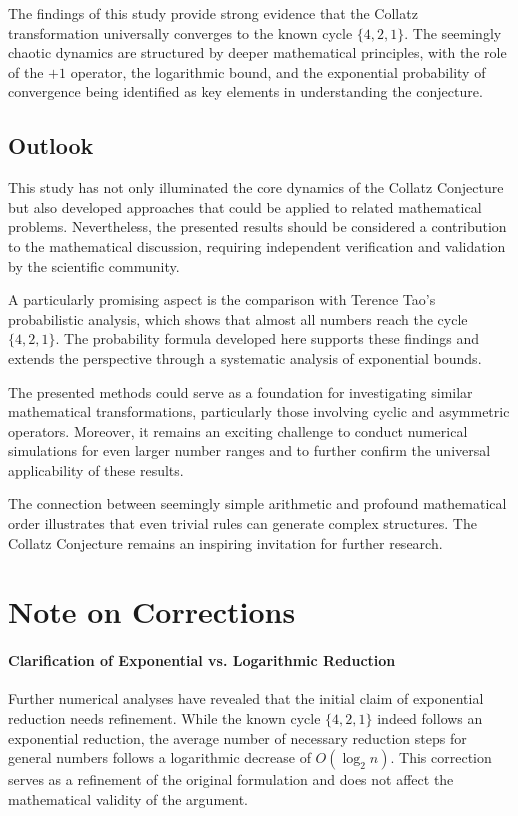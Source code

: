 \documentclass[a4paper,12pt]{article}
\begin{document}
The findings of this study provide strong evidence that the Collatz transformation universally converges to the known cycle \( \{4, 2, 1\} \). The seemingly chaotic dynamics are structured by deeper mathematical principles, with the role of the \(+1\) operator, the logarithmic bound, and the exponential probability of convergence being identified as key elements in understanding the conjecture.

\subsection{Outlook}
This study has not only illuminated the core dynamics of the Collatz Conjecture but also developed approaches that could be applied to related mathematical problems. Nevertheless, the presented results should be considered a contribution to the mathematical discussion, requiring independent verification and validation by the scientific community.

A particularly promising aspect is the comparison with Terence Tao’s probabilistic analysis, which shows that almost all numbers reach the cycle \( \{4,2,1\} \). The probability formula developed here supports these findings and extends the perspective through a systematic analysis of exponential bounds.

The presented methods could serve as a foundation for investigating similar mathematical transformations, particularly those involving cyclic and asymmetric operators. Moreover, it remains an exciting challenge to conduct numerical simulations for even larger number ranges and to further confirm the universal applicability of these results.

The connection between seemingly simple arithmetic and profound mathematical order illustrates that even trivial rules can generate complex structures. The Collatz Conjecture remains an inspiring invitation for further research.

\section*{Note on Corrections}  

\paragraph{Clarification of Exponential vs. Logarithmic Reduction}  
Further numerical analyses have revealed that the initial claim of exponential reduction needs refinement. While the known cycle \( \{4,2,1\} \) indeed follows an exponential reduction, the average number of necessary reduction steps for general numbers follows a logarithmic decrease of \( O(\log_2 n) \). This correction serves as a refinement of the original formulation and does not affect the mathematical validity of the argument.
\end{document}
